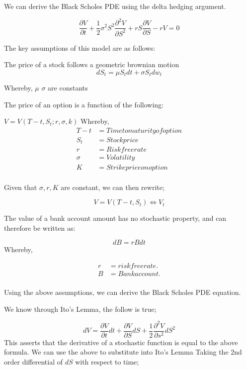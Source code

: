 \documentclass[12pt]{article}
\begin{document}
We can derive the Black Scholes PDE using the delta hedging argument.

\begin{equation}
\frac{\partial V}{\partial t} + \frac{1}{2}\sigma^2S^2 \frac{\partial^2 V}{\partial S^2}+rS\frac{\partial V}{\partial S} - rV = 0
\end{equation}

The key assumptions of this model are as follows:

The price of a stock follows a geometric brownian motion
\begin{equation}
dS_{t}= \mu S_{t} dt + \sigma S_{t} dw_{t}
\end{equation}

Whereby, $\mu$ $\sigma$ are constants

The price of an option is a function of the following:


$V = V(T-t, S_{t}; r, \sigma, k)$
Whereby,
\begin{align*}
T - t &= Time to maturity of option \\
S_{t} &= Stock price \\
r &= Risk free rate \\
\sigma &= Volatility \\
K &= Strike price on option \\
\end{align*}

Given that $\sigma, r, K$ are constant, we can then rewrite;

\begin{equation}
V = V(T-t,S_{t}) \iff V_{t}
\end{equation}

The value of a bank account amount has no stochastic property, and can therefore be written as:

\begin{equation}
dB = rBdt
\end{equation}
Whereby,

\begin{align*}
r &= risk free rate. \\
B &= Bank account. \\
\end{align*}

Using the above assumptions, we can derive the Black Scholes PDE equation.

We know through Ito's Lemma, the follow is true;

\begin{equation}
dV = \frac{\partial V}{\partial t}dt + \frac{\partial V}{\partial S}dS + \frac{1}{2}\frac{\partial^2 V}{\partial s^2}dS^2
\end{equation}
This asserts that the derivative of a stochastic function is equal to the above formula.
We can use the above to substitute into Ito's Lemma
Taking the 2nd order differential of $dS$ with respect to time;
\end{document}
